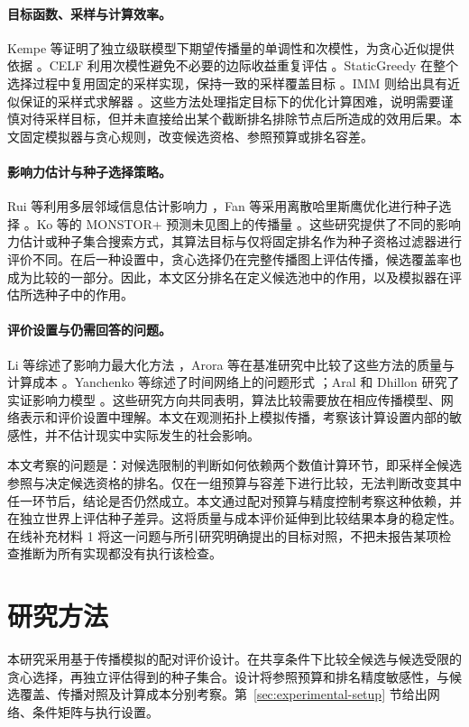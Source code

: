 \documentclass[smallextended]{svjour3}
\begin{document}
\paragraph{目标函数、采样与计算效率。}Kempe 等证明了独立级联模型下期望传播量的单调性和次模性，为贪心近似提供依据 \cite{ref1}。CELF 利用次模性避免不必要的边际收益重复评估 \cite{ref7}。StaticGreedy 在整个选择过程中复用固定的采样实现，保持一致的采样覆盖目标 \cite{ref8}。IMM 则给出具有近似保证的采样式求解器 \cite{ref2}。这些方法处理指定目标下的优化计算困难，说明需要谨慎对待采样目标，但并未直接给出某个截断排名排除节点后所造成的效用后果。本文固定模拟器与贪心规则，改变候选资格、参照预算或排名容差。

\paragraph{影响力估计与种子选择策略。}Rui 等利用多层邻域信息估计影响力 \cite{ref12}，Fan 等采用离散哈里斯鹰优化进行种子选择 \cite{ref13}。Ko 等的 MONSTOR+ 预测未见图上的传播量 \cite{ref19}。这些研究提供了不同的影响力估计或种子集合搜索方式，其算法目标与仅将固定排名作为种子资格过滤器进行评价不同。在后一种设置中，贪心选择仍在完整传播图上评估传播，候选覆盖率也成为比较的一部分。因此，本文区分排名在定义候选池中的作用，以及模拟器在评估所选种子中的作用。

\paragraph{评价设置与仍需回答的问题。}Li 等综述了影响力最大化方法 \cite{ref9}，Arora 等在基准研究中比较了这些方法的质量与计算成本 \cite{ref16}。Yanchenko 等综述了时间网络上的问题形式 \cite{ref11}；Aral 和 Dhillon 研究了实证影响力模型 \cite{ref15}。这些研究方向共同表明，算法比较需要放在相应传播模型、网络表示和评价设置中理解。本文在观测拓扑上模拟传播，考察该计算设置内部的敏感性，并不估计现实中实际发生的社会影响。

本文考察的问题是：对候选限制的判断如何依赖两个数值计算环节，即采样全候选参照与决定候选资格的排名。仅在一组预算与容差下进行比较，无法判断改变其中任一环节后，结论是否仍然成立。本文通过配对预算与精度控制考察这种依赖，并在独立世界上评估种子差异。这将质量与成本评价延伸到比较结果本身的稳定性。在线补充材料 1 将这一问题与所引研究明确提出的目标对照，不把未报告某项检查推断为所有实现都没有执行该检查。

\section{研究方法}
本研究采用基于传播模拟的配对评价设计。在共享条件下比较全候选与候选受限的贪心选择，再独立评估得到的种子集合。设计将参照预算和排名精度敏感性，与候选覆盖、传播对照及计算成本分别考察。第~\ref{sec:experimental-setup} 节给出网络、条件矩阵与执行设置。
\end{document}
